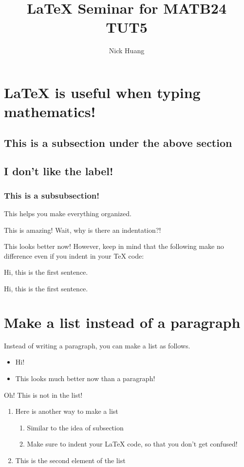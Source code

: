\documentclass{article}
\title{LaTeX Seminar for MATB24 TUT5}
\author{Nick Huang}
\begin{document}
\maketitle %

\section{LaTeX is useful when typing mathematics!}
\subsection{This is a subsection under the above section}
\subsection*{I don't like the label!}
\subsubsection{This is a subsubsection!}

This helps you make everything organized.

This is amazing! Wait, why is there an indentation?!

\setlength\parindent{0pt}

This looks better now! However, keep in mind that the following make no difference even if you indent in your TeX code:

Hi, this is the first sentence.

    Hi, this is the first sentence.
    
\section{Make a list instead of a paragraph}

Instead of writing a paragraph, you can make a list as follows.

    \begin{itemize}
        \item Hi!
        \item This looks much better now than a paragraph!
    \end{itemize}
    
    Oh! This is not in the list!
    
    \begin{enumerate}
        \item Here is another way to make a list
            \begin{enumerate}
                \item Similar to the idea of subsection
                \item Make sure to indent your LaTeX code, so that you don't get confused!
            \end{enumerate}
        \item This is the second element of the list
    \end{enumerate}
    
\end{document}
